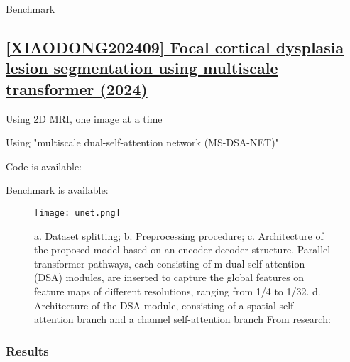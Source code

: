 \begin{table}[htbp]
	\centering
	\caption{Benchmark}

	\caption{Results from }
	\label{tab:res7}
\end{table}

\newpage
\subsection{\href{https://insightsimaging.springeropen.com/articles/10.1186/s13244-024-01803-8}{[XIAODONG202409] Focal cortical dysplasia lesion segmentation using multiscale transformer (2024) }}
\label{res8}

Using 2D MRI, one image at a time

Using "multiscale dual-self-attention network (MS-DSA-NET)"

Code is available: 

Benchmark is available: 

\begin{figure}[htbp]
	\centering
	\texttt{[image: unet.png]}
	\caption{a. Dataset splitting; b. Preprocessing procedure; c. Architecture of the proposed model based on an encoder-decoder structure. Parallel transformer pathways, each consisting of m dual-self-attention (DSA) modules, are inserted to capture the global features on feature maps of different resolutions, ranging from 1/4 to 1/32. d. Architecture of the DSA module, consisting of a spatial self-attention branch and a channel self-attention branch From research: }
	\label{fig:res8}
\end{figure}

\subsubsection{Results}

